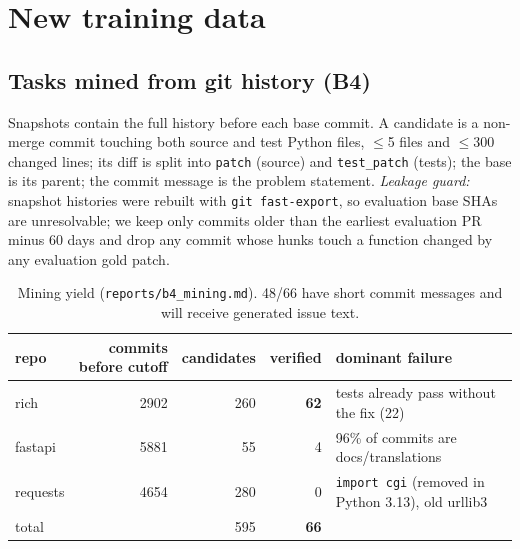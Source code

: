 \documentclass[10pt,a4paper]{article}
\newcommand{\code}[1]{\texttt{#1}}
\newcommand{\1}{\mathbb{1}}
\begin{document}
\section{New training data}
\label{sec:data}
\subsection{Tasks mined from git history (B4)}
Snapshots contain the full history before each base commit. A candidate is a non-merge commit touching both
source and test Python files, $\le$5 files and $\le$300 changed lines; its diff is split into \code{patch} (source) and
\code{test\_patch} (tests); the base is its parent; the commit message is the problem statement. \emph{Leakage
guard:} snapshot histories were rebuilt with \code{git fast-export}, so evaluation base SHAs are unresolvable; we keep
only commits older than the earliest evaluation PR minus 60 days and drop any commit whose hunks touch a function
changed by any evaluation gold patch.
\begin{table}[H]\centering\small
\begin{tabular}{lrrrl}\toprule
repo & commits before cutoff & candidates & verified & dominant failure\\\midrule
rich & 2902 & 260 & \textbf{62} & tests already pass without the fix (22)\\
fastapi & 5881 & 55 & 4 & 96\% of commits are docs/translations\\
requests & 4654 & 280 & 0 & \code{import cgi} (removed in Python 3.13), old urllib3\\\midrule
total & & 595 & \textbf{66} & \\\bottomrule
\end{tabular}\caption{Mining yield (\code{reports/b4\_mining.md}). 48/66 have short commit messages and will receive generated issue text.}\end{table}
\end{document}
